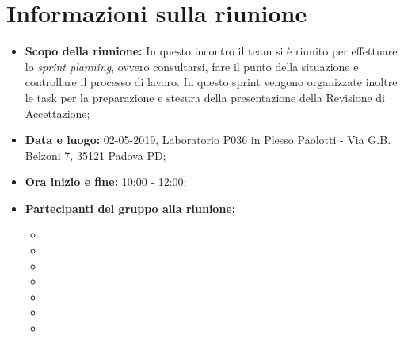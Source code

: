 \clearpage
\section{Informazioni sulla riunione}
\begin{itemize}
	\item \textbf {Scopo della riunione:} In questo incontro il team si è riunito per effettuare lo \textit{sprint planning}, ovvero consultarsi, fare il punto della situazione e controllare il processo di lavoro. In questo sprint vengono organizzate inoltre le task per la preparazione e stesura della presentazione della Revisione di Accettazione;
	\item \textbf {Data e luogo:} 02-05-2019, Laboratorio P036 in Plesso Paolotti - Via G.B. Belzoni 7, 35121 Padova PD;
	\item \textbf {Ora inizio e fine:} 10:00 - 12:00;
	\item \textbf {Partecipanti del gruppo alla riunione:} 
		 \begin{itemize}
			\item \sonia
			\item \pardeep
			\item \luca
			\item \matteo
			\item \alberto
			\item \alessandro
			\item \andrea
		\end{itemize}
\end{itemize}